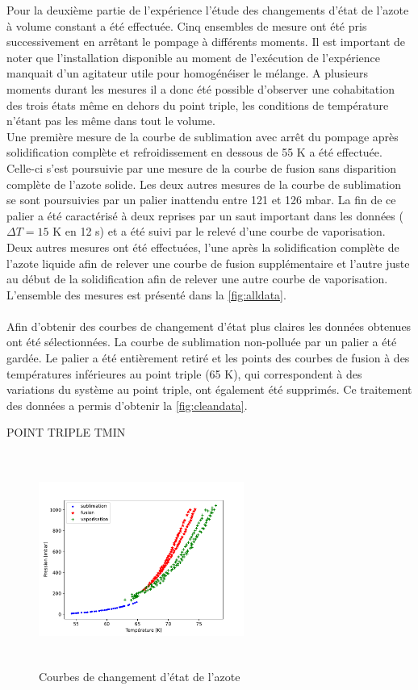 Pour la deuxième partie de l'expérience l'étude des changements d'état de l'azote à volume constant a été effectuée. Cinq ensembles de mesure ont été pris successivement en arrêtant le pompage à différents moments. Il est important de noter que l'installation disponible au moment de l'exécution de l'expérience manquait d'un agitateur utile pour homogénéiser le mélange. A plusieurs moments durant les mesures il a donc été possible d'observer une cohabitation des trois états même en dehors du point triple, les conditions de température n'étant pas les même dans tout le volume. \\
Une première mesure de la courbe de sublimation avec arrêt du pompage après solidification complète et refroidissement en dessous de 55 \si{\kelvin} a été effectuée. Celle-ci s'est poursuivie par une mesure de la courbe de fusion sans disparition complète de l'azote solide. Les deux autres mesures de la courbe de sublimation se sont poursuivies par un palier inattendu entre 121 et 126 \si{\milli \bar}. La fin de ce palier a été caractérisé à deux reprises par un saut important dans les données (\(\Delta T = 15\) \si{\kelvin} en 12 \si{\second}) et a été suivi par le relevé d'une courbe de vaporisation. Deux autres mesures ont été effectuées, l'une après la solidification complète de l'azote liquide afin de relever une courbe de fusion supplémentaire et l'autre juste au début de la solidification afin de relever une autre courbe de vaporisation. L'ensemble des mesures est présenté dans la \autoref{fig:alldata}. \\
\\
Afin d'obtenir des courbes de changement d'état plus claires les données obtenues ont été sélectionnées. La courbe de sublimation non-polluée par un palier a été gardée. Le palier a été entièrement retiré et les points des courbes de fusion à des températures inférieures au point triple (65 \si{\kelvin}), qui correspondent à des variations du système au point triple, ont également été supprimés. Ce traitement des données a permis d'obtenir la \autoref{fig:cleandata}.

POINT TRIPLE TMIN


\begin{figure}
    \centering
    \includegraphics[width=0.6\textwidth, height=7cm]{figures/etats_azote_clean.pdf}
    \caption{Courbes de changement d'état de l'azote}
    \label{fig:cleandata}
\end{figure}




